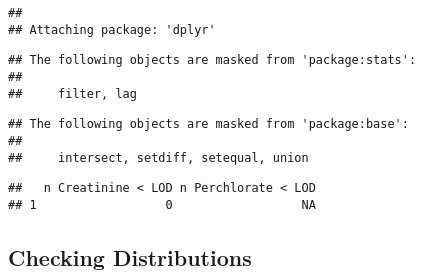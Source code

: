 \documentclass[]{article}
\newenvironment{Shaded}{\begin{snugshade}}{\end{snugshade}}
\newcommand{\CommentTok}[1]{\textcolor[rgb]{0.56,0.35,0.01}{\textit{#1}}}
\newcommand{\DataTypeTok}[1]{\textcolor[rgb]{0.13,0.29,0.53}{#1}}
\newcommand{\KeywordTok}[1]{\textcolor[rgb]{0.13,0.29,0.53}{\textbf{#1}}}
\newcommand{\NormalTok}[1]{#1}
\newcommand{\OperatorTok}[1]{\textcolor[rgb]{0.81,0.36,0.00}{\textbf{#1}}}
\newcommand{\StringTok}[1]{\textcolor[rgb]{0.31,0.60,0.02}{#1}}
\begin{document}
\begin{verbatim}
## 
## Attaching package: 'dplyr'
\end{verbatim}

\begin{verbatim}
## The following objects are masked from 'package:stats':
## 
##     filter, lag
\end{verbatim}

\begin{verbatim}
## The following objects are masked from 'package:base':
## 
##     intersect, setdiff, setequal, union
\end{verbatim}

\begin{Shaded}
\end{Shaded}

\begin{verbatim}
##   n Creatinine < LOD n Perchlorate < LOD
## 1                  0                  NA
\end{verbatim}

\begin{Shaded}
\end{Shaded}

\hypertarget{checking-distributions}{%
\subsection{Checking Distributions}\label{checking-distributions}}

\begin{Shaded}
\end{Shaded}
\end{document}
